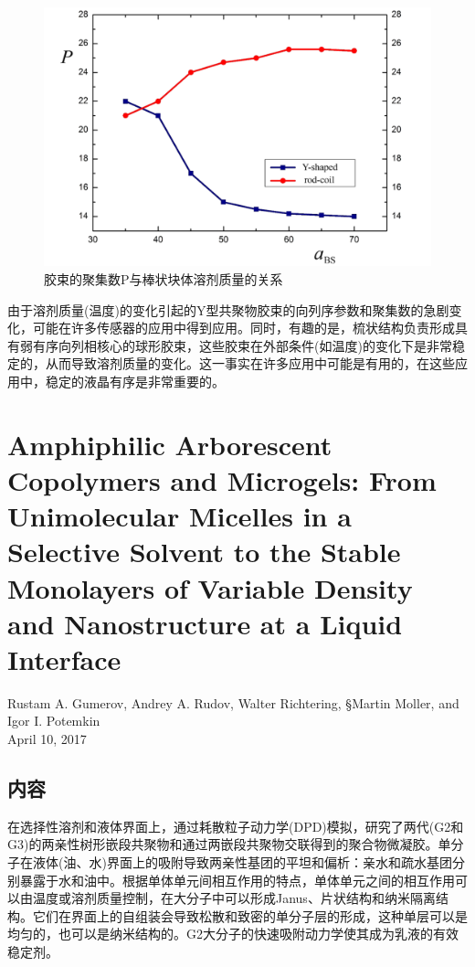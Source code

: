 \documentclass[12pt,a4paper]{article}
\numberwithin{equation}{section}
\begin{document}
\begin{figure}[H]
\centering
\includegraphics[scale=0.4]{./figures/17.png}
\caption{胶束的聚集数P与棒状块体溶剂质量的关系}
\end{figure}
由于溶剂质量(温度)的变化引起的Y型共聚物胶束的向列序参数和聚集数的急剧变化，可能在许多传感器的应用中得到应用。同时，有趣的是，梳状结构负责形成具有弱有序向列相核心的球形胶束，这些胶束在外部条件(如温度)的变化下是非常稳定的，从而导致溶剂质量的变化。这一事实在许多应用中可能是有用的，在这些应用中，稳定的液晶有序是非常重要的。


\section{Amphiphilic Arborescent Copolymers and Microgels: From Unimolecular Micelles in a Selective Solvent to the Stable Monolayers of Variable Density and Nanostructure at a Liquid Interface}	
\begin{center}
Rustam A. Gumerov, Andrey A. Rudov, Walter Richtering, §Martin Moller, and Igor I. Potemkin\\
April 10, 2017
\end{center}
\subsection{内容}
在选择性溶剂和液体界面上，通过耗散粒子动力学(DPD)模拟，研究了两代(G2和G3)的两亲性树形嵌段共聚物和通过两嵌段共聚物交联得到的聚合物微凝胶。单分子在液体(油、水)界面上的吸附导致两亲性基团的平坦和偏析：亲水和疏水基团分别暴露于水和油中。根据单体单元间相互作用的特点，单体单元之间的相互作用可以由温度或溶剂质量控制，在大分子中可以形成Janus、片状结构和纳米隔离结构。它们在界面上的自组装会导致松散和致密的单分子层的形成，这种单层可以是均匀的，也可以是纳米结构的。G2大分子的快速吸附动力学使其成为乳液的有效稳定剂。
\end{document}

